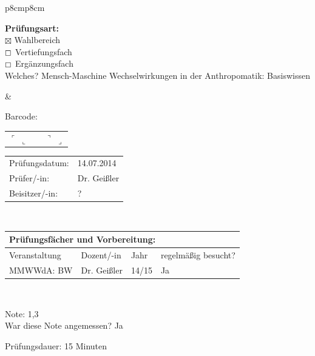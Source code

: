 \documentclass[a4paper]{article}
\newcommand{\Fach}{Mensch-Maschine Wechselwirkungen in der Anthropomatik: Basiswissen}
\newcommand{\Pruefungsdatum}{14.07.2014}    %
\newcommand{\Pruefer}{Dr. Geißler}
\newcommand{\Beisitzer}{?}
\newcommand{\Note}{1,3}
\newcommand{\Dauer}{15} %
\begin{document}
\begin{tabular}{p{8cm}p{8cm}}
\begin{flushleft}
   \textbf{Prüfungsart:}\\
   $\boxtimes$ Wahlbereich  \\
   $\boxempty$ Vertiefungsfach  \\
   $\boxempty$ Ergänzungsfach  \\[0.5cm]
   Welches? \Fach
  \end{flushleft}
  &
  \begin{center}
   Barcode:
   \begin{tabular}{p{0.2cm}p{6.8cm}p{0.2cm}}
   $\ulcorner$
   \vskip 2cm
   $\llcorner$ & & $\urcorner$
   \vskip 2cm
   $\lrcorner$ \\
   \end{tabular}
  \end{center}
  \vskip 0.5cm
  \begin{flushright}
  \begin{tabular}{ll}
   Prüfungsdatum:   & \Pruefungsdatum \\[0.5cm]
   Prüfer/-in:      & \Pruefer \\[0.5cm]
   Beisitzer/-in:   & \Beisitzer \\
  \end{tabular}
  \end{flushright} \\
 \end{tabular}

 \begin{tabular}{|p{8.2cm}|p{3cm}|p{1cm}|p{3.5cm}|}
  \multicolumn{4}{l}{\bfseries Prüfungsfächer und Vorbereitung: } \\[0.2cm]
  \hline
  Veranstaltung & Dozent/-in  & Jahr & regelmäßig besucht? \\
  \hline
  \hline
  MMWWdA: BW & Dr. Geißler & 14/15 &  Ja \\[0.2cm]
  \hline
 \end{tabular} \\[0.5cm]

\begin{multicols}{2}
Note: \Note\\[0.5cm]
War diese Note angemessen?
Ja

\columnbreak
Prüfungsdauer: \Dauer{} Minuten \\[0.5cm]
\end{multicols}
\end{document}
